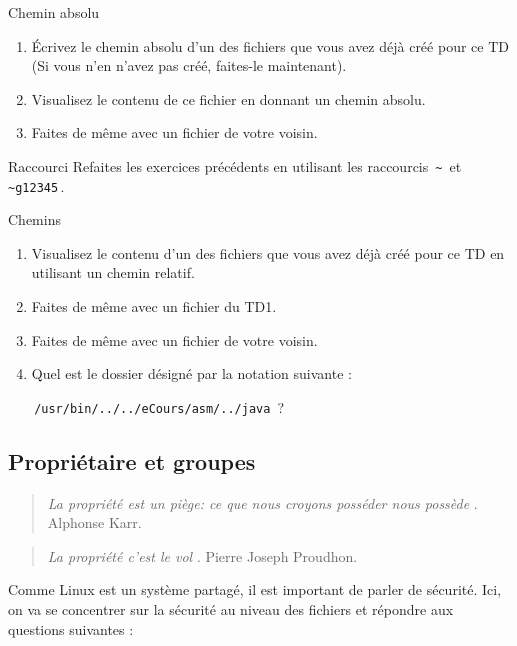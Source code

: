 \documentclass[a4paper,11pt]{article}
\begin{document}
\begin{Tutoriel}{Chemin absolu}%
%
\begin{enumerate}	
	\item \'Ecrivez le chemin absolu d'un des fichiers que vous
	avez d\'ej\`a cr\'e\'e pour ce TD (Si vous n'en n'avez pas cr\'e\'e, 
	faites-le maintenant).  
	\item Visualisez le contenu de ce fichier en donnant un
	chemin absolu.
	\item Faites de m\^eme avec un fichier de votre voisin.
	
\end{enumerate}	
\end{Tutoriel}


\begin{Tutoriel}{Raccourci}
%	
	Refaites les exercices pr\'ec\'edents en utilisant les raccourcis 
	\,\verb|~|\, et \,\verb|~g12345|\,.
	
	\par
\end{Tutoriel}


\begin{Tutoriel}{Chemins}
%	
	\begin{enumerate}
		
		\item Visualisez le contenu d'un des fichiers que vous avez d\'ej\`a cr\'e\'e pour ce TD en utilisant un chemin relatif.
		\item Faites de m\^eme avec un fichier du TD1. 
		\item Faites de m\^eme avec un fichier de votre voisin. 
		\item 
		Quel est le dossier d\'esign\'e par la notation suivante : \par
		\,\verb|/usr/bin/../../eCours/asm/../java|\, ?
		
	\end{enumerate}
\end{Tutoriel}



\subsection{Propri\'etaire et groupes}\begin{quotation}  
	\guillemotleft \textit{ La propri\'et\'e est un pi\`ege: ce que nous croyons poss\'eder nous poss\`ede }\guillemotright . 
	Alphonse Karr.  
\end{quotation}\begin{quotation}  
	\guillemotleft \textit{ La propri\'et\'e c'est le vol }\guillemotright . Pierre Joseph Proudhon.  
\end{quotation}  
Comme Linux est un syst\`eme partag\'e, il est important de parler de s\'ecurit\'e. 
Ici, on va se concentrer sur la s\'ecurit\'e au niveau des fichiers et r\'epondre aux questions suivantes :  
\end{document}

